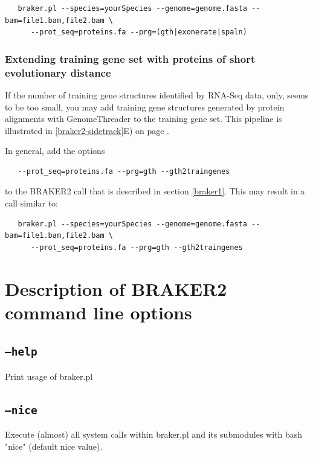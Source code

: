 \documentclass[a4paper,10pt]{report}
\begin{document}
\begin{verbatim}
   braker.pl --species=yourSpecies --genome=genome.fasta --bam=file1.bam,file2.bam \
      --prot_seq=proteins.fa --prg=(gth|exonerate|spaln)
\end{verbatim}

\subsubsection{Extending training gene set with proteins of short evolutionary distance}

If the number of training gene structures identified by RNA-Seq data, only, seems to be too small, you may add training gene structures generated by protein alignments with GenomeThreader to the training gene set. This pipeline is illustrated in \ref{braker2-sidetrack}E) on page \pageref{braker2-sidetrack}.

In general, add the options

\begin{verbatim}
   --prot_seq=proteins.fa --prg=gth --gth2traingenes
\end{verbatim}

to the BRAKER2 call that is described in section \ref{braker1}. This may result in a call similar to:

\begin{verbatim}
   braker.pl --species=yourSpecies --genome=genome.fasta --bam=file1.bam,file2.bam \
      --prot_seq=proteins.fa --prg=gth --gth2traingenes
\end{verbatim}

\section{Description of BRAKER2 command line options}\label{options}

\subsection{\texttt{--help}}                               

Print usage of braker.pl

\subsection{\texttt{--nice}}

Execute (almost) all system calls within braker.pl and its submodules with bash "nice" (default nice value).
\end{document}
